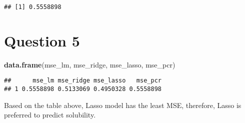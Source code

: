 \documentclass[
]{article}
\newenvironment{Shaded}{\begin{snugshade}}{\end{snugshade}}
\newcommand{\KeywordTok}[1]{\textcolor[rgb]{0.13,0.29,0.53}{\textbf{#1}}}
\newcommand{\NormalTok}[1]{#1}
\begin{document}
\begin{verbatim}
## [1] 0.5558898
\end{verbatim}

\hypertarget{question-5}{%
\section{Question 5}\label{question-5}}

\begin{Shaded}
\begin{Highlighting}[]
\KeywordTok{data.frame}\NormalTok{(mse_lm, mse_ridge, mse_lasso, mse_pcr)}
\end{Highlighting}
\end{Shaded}

\begin{verbatim}
##      mse_lm mse_ridge mse_lasso   mse_pcr
## 1 0.5558898 0.5133069 0.4950328 0.5558898
\end{verbatim}

Based on the table above, Lasso model has the least MSE, therefore,
Lasso is preferred to predict solubility.
\end{document}
